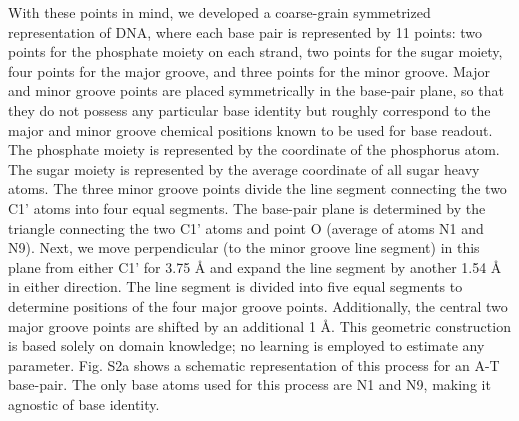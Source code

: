 With these points in mind, we developed a coarse-grain symmetrized representation of DNA, where each base pair is represented by 11 points: two points for the phosphate moiety on each strand, two points for the sugar moiety, four points for the major groove, and three points for the minor groove. Major and minor groove points are placed symmetrically in the base-pair plane, so that they do not possess any particular base identity but roughly correspond to the major and minor groove chemical positions known \citep{Chiu2023} to be used for base readout. The phosphate moiety is represented by the coordinate of the phosphorus atom. The sugar moiety is represented by the average coordinate of all sugar heavy atoms. The three minor groove points divide the line segment connecting the two C1' atoms into four equal segments. The base-pair plane is determined by the triangle connecting the two C1' atoms and point O (average of atoms N1 and N9). Next, we move perpendicular (to the minor groove line segment) in this plane from either C1' for 3.75 Å and expand the line segment by another 1.54 Å in either direction. The line segment is divided into five equal segments to determine positions of the four major groove points. Additionally, the central two major groove points are shifted by an additional 1 Å. This geometric construction is based solely on domain knowledge; no learning is employed to estimate any parameter. Fig. S2a shows a schematic representation of this process for an A-T base-pair. The only base atoms used for this process are N1 and N9, making it agnostic of base identity. 

